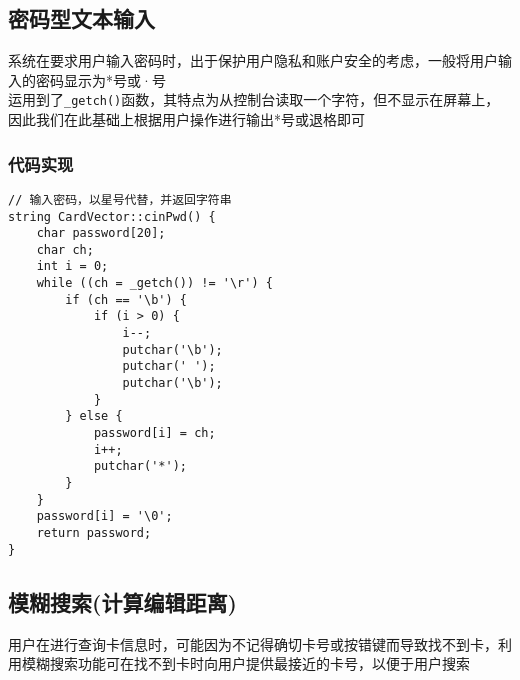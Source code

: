 \documentclass[UTF8]{ctexart}
\begin{document}
	\subsection{密码型文本输入}
	\qquad 系统在要求用户输入密码时，出于保护用户隐私和账户安全的考虑，一般将用户输入的密码显示为*号或·号 \\
	\qquad 运用到了\lstinline{_getch()}函数，其特点为从控制台读取一个字符，但不显示在屏幕上，因此我们在此基础上根据用户操作进行输出*号或退格即可
	\subsubsection{代码实现}
	\begin{lstlisting}
// 输入密码，以星号代替，并返回字符串
string CardVector::cinPwd() {
    char password[20];
    char ch;
    int i = 0;
    while ((ch = _getch()) != '\r') {
        if (ch == '\b') {
            if (i > 0) {
                i--;
                putchar('\b');
                putchar(' ');
                putchar('\b');
            }
        } else {
            password[i] = ch;
            i++;
            putchar('*');
        }
    }
    password[i] = '\0';
    return password;
}
	\end{lstlisting}	
	
	\subsection{模糊搜索(计算编辑距离)}
	\qquad 用户在进行查询卡信息时，可能因为不记得确切卡号或按错键而导致找不到卡，利用模糊搜索功能可在找不到卡时向用户提供最接近的卡号，以便于用户搜索 \\
	
\end{document}
